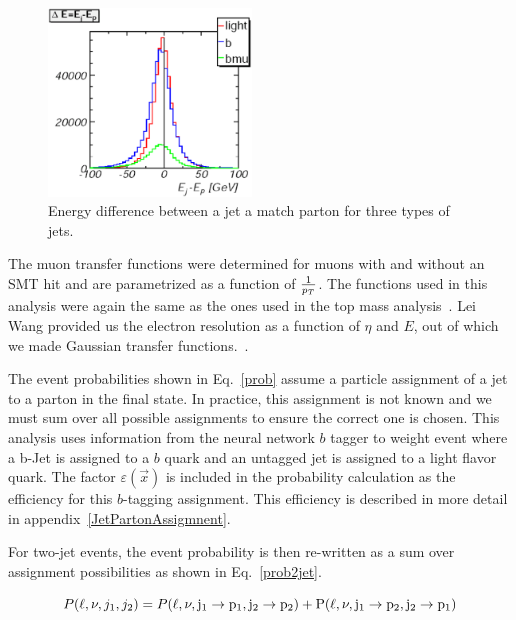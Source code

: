 \vspace{0.1in}
\begin{figure}[!h!tbp]
\begin{center}
\includegraphics[width=0.48\textwidth]{figures/transfer/tfs.eps}
\end{center}
\vspace{-0.1in}
\caption[2jets]{Energy difference between a jet a match parton for three types
of jets.}
\label{FlavorTF}
\end{figure}

The muon transfer functions were determined for muons with and without
an SMT hit and are parametrized as a function of
$\large{\frac{1}{p_{T}}}$. The functions used in this analysis were
again the same as the ones used in the top mass
analysis~\cite{MuonTF,MuonTF2}. Lei Wang provided us the electron
resolution as a function of $\eta$ and $E$, out of which we made
Gaussian transfer functions.~\cite{ElectronTF}.

The event probabilities shown in Eq.~\ref{prob} assume a particle
assignment of a jet to a parton in the final state. In practice, this assignment
is not known and we must sum over all possible assignments to ensure the correct
one is chosen. This analysis uses
information from the neural network $b$ tagger to weight event where a b-Jet is
assigned to a $b$ quark and an untagged jet is assigned to a light flavor quark. The factor
$\varepsilon(\vec{x})$ is included in the probability calculation as the efficiency
for this $b$-tagging assignment. This efficiency is described in more detail in
appendix~\ref{JetPartonAssigmnent}. 

For two-jet events, the event probability is then re-written as a sum over
assignment possibilities as shown in Eq.~\ref{prob2jet}.

\begin{equation}
\label{prob2jet}
P(\ell, \nu, j_{1}, j_{2}) = P(\ell, \nu, \rm{j}_{1} \rightarrow p_{1}, j_{2}
\rightarrow p_{2}) + P(\ell, \nu, \rm{j}_{1} \rightarrow p_{2}, j_{2} \rightarrow p_{1})
\end{equation}

